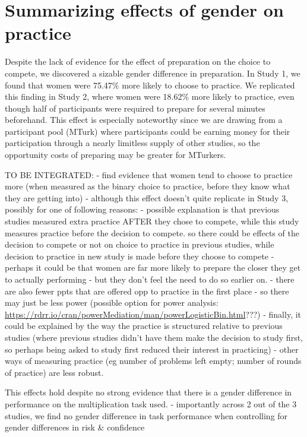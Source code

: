 \documentclass[a4paper, nobind]{templates/ociamthesis}
\begin{document}
\hypertarget{summarizing-effects-of-gender-on-practice}{%
\section{Summarizing effects of gender on practice}\label{summarizing-effects-of-gender-on-practice}}

Despite the lack of evidence for the effect of preparation on the choice to compete, we discovered a sizable gender difference in preparation. In Study 1, we found that women were 75.47\% more likely to choose to practice. We replicated this finding in Study 2, where women were 18.62\% more likely to practice, even though half of participants were required to prepare for several minutes beforehand. This effect is especially noteworthy since we are drawing from a participant pool (MTurk) where participants could be earning money for their participation through a nearly limitless supply of other studies, so the opportunity costs of preparing may be greater for MTurkers.

TO BE INTEGRATED:
- find evidence that women tend to choose to practice more (when measured as the binary choice to practice, before they know what they are getting into)
- although this effect doesn't quite replicate in Study 3, possibly for one of following reasons:
- possible explanation is that previous studies measured extra practice AFTER they chose to compete, while this study measures practice before the decision to compete. so there could be effects of the decision to compete or not on choice to practice in previous studies, while decision to practice in new study is made before they choose to compete
- perhaps it could be that women are far more likely to prepare the closer they get to actually performing - but they don't feel the need to do so earlier on.
- there are also fewer ppts that are offered opp to practice in the first place - so there may just be less power (possible option for power analysis: \url{https://rdrr.io/cran/powerMediation/man/powerLogisticBin.html}???)
- finally, it could be explained by the way the practice is structured relative to previous studies (where previous studies didn't have them make the decision to study first, so perhaps being asked to study first reduced their interest in practicing)
- other ways of measuring practice (eg number of problems left empty; number of rounds of practice) are less robust.

This effects hold despite no strong evidence that there is a gender difference in performance on the multiplication task used. - importantly across 2 out of the 3 studies, we find no gender difference in task performance when controlling for gender differences in risk \& confidence
\end{document}
